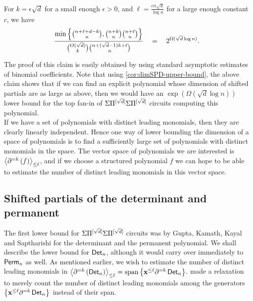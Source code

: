 \begin{claim}\label{clm:spd-ratio}
For $k = \epsilon \sqrt{d}$ for a small enough $\epsilon > 0$, and $\ell = \frac{c n\sqrt{d}}{\log n}$ for a large enough constant $c$, we have
$$
\frac{\min\left\{\binom{n + \ell + d -k}{n}, \binom{n+k}{n} \binom{n+\ell}{n}\right\}}{\binom{O(\sqrt{d})}{k}\binom{n + (\sqrt{d}-1)k + \ell}{n}} \quad = \quad 2^{\Omega(\sqrt{d}\log n)}.
$$
\end{claim}

The proof of this claim is easily obtained by using standard asymptotic estimates of binomial coefficients. 
Note that using \autoref{cor:dimSPD-upper-bound}, the above claim shows that if we can find an explicit polynomial whose dimension of shifted partials are as large as above, then we would have an $\exp(\Omega(\sqrt{d}\log n))$ lower bound for the top fan-in of $\Sigma\Pi^{[\sqrt{d}]}\Sigma\Pi^{[\sqrt{d}]}$ circuits computing this polynomial.\\


If we have a set of polynomials with distinct leading monomials, then they are clearly linearly independent. 
Hence one way of lower bounding the dimension of a space of polynomials is to find a sufficiently large set of polynomials with distinct monomials in the space. 
The vector space of polynomials we are interested is $\left\langle\partial^{=k}\left(f\right)\right\rangle_{\leq \ell}$, and if we choose a structured polynomial $f$ we can hope to be able to estimate the number of distinct leading monomials in this vector space. 

\subsection{Shifted partials of the determinant and permanent}

The first lower bound for $\Sigma\Pi^{[\sqrt{d}]}\Sigma\Pi^{[\sqrt{d}]}$ circuits was by Gupta, Kamath, Kayal and Saptharishi \cite{gkks13} for the determinant and the permanent polynomial. 
We shall describe the lower bound for $\operatorname{\mathsf{Det}}_n$, although it would carry over immediately to $\operatorname{\mathsf{Perm}}_n$ as well. 
As mentioned earlier, we wish to estimate the number of distinct leading monomials in $\left\langle\partial^{=k}\left(\operatorname{\mathsf{Det}}_n\right)\right\rangle_{\leq \ell} = \mathrm{span}\left\{\mathbf{x}^{\leq \ell}\partial^{=k}\operatorname{\mathsf{Det}}_n\right\}$. \cite{gkks13} made a relaxation to merely count the number of distinct leading monomials among the generators $\left\{\mathbf{x}^{\leq \ell}\partial^{=k}\operatorname{\mathsf{Det}}_n\right\}$ instead of their span. \\

